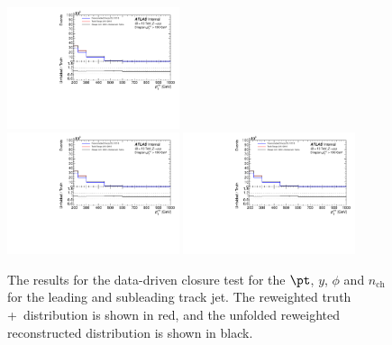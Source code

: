 \begin{figure}[h!]
  \includegraphics[page=633,width=0.45\textwidth]{figures/IBUClosureTests.pdf} \\
  \includegraphics[page=663,width=0.45\textwidth]{figures/IBUClosureTests.pdf}
  \includegraphics[page=669,width=0.45\textwidth]{figures/IBUClosureTests.pdf}
  \caption{The results for the data-driven closure test for the $\pt$, $y$, $\phi$ and $n_{\text{ch}}$ for the leading and subleading track jet. The reweighted truth \powheg+\pythia~distribution is shown in red, and the unfolded reweighted reconstructed distribution is shown in black.}
  \label{fig:DDTestTJ1}
\end{figure}

